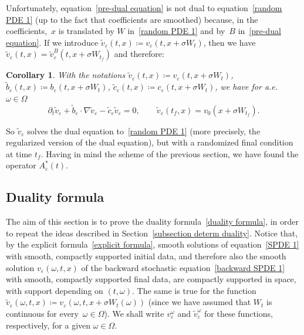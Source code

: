 \documentclass[a4paper,10pt]{article}
\newtheorem{corollary}[theorem]{Corollary}
\newcommand\1{\mathbbm{1}}
\newcommand{\eps}{\varepsilon}
\numberwithin{equation}{section}
\begin{document}
Unfortunately, equation~\eqref{pre-dual equation} is not dual to equation~\eqref{random PDE 1} (up to the fact that coefficients are smoothed) because, in the coefficients,~$x$ is translated by $W$ in~\eqref{random PDE 1} and by~$B$ in~\eqref{pre-dual equation}. If we introduce $\widetilde{v}_{\eps}(t,x) \coloneqq v_{\eps}(t,x+\sigma W_{t}) $, then we have
$\widetilde{v}_{\eps}(t,x)  =\widetilde{v}_{\eps}^{B}(t,x+\sigma W_{t_{f}})$ and therefore:

\begin{corollary}\label{SPDE PDE backward}
With the notations $\widetilde{v}_{\eps}( t,x)\coloneqq v_{\eps}(t,x+\sigma W_{t})$, $\widetilde{b}_{\eps}(t,x)\coloneqq b_{\eps}(t,x+\sigma W_{t})$, $\widetilde{c}_{\eps}(t,x)\coloneqq c_{\eps}(t,x+\sigma W_{t})$, we have for a.e.~$\omega\in\Omega$
\begin{equation}
\partial_t \widetilde{v}_{\eps} +\widetilde{b}_{\eps}\cdot\nabla\widetilde{v}_{\eps}-\widetilde{c}_{\eps}\widetilde{v}_{\eps}=0,\qquad\widetilde{v}_{\eps} (t_{f},x)
=v_{0}(x+\sigma W_{t_{f}}) . \label{dual equation}
\end{equation}
\end{corollary}

So $\widetilde{v}_{\eps}$ solves the dual equation to~\eqref{random PDE 1} (more precisely, the regularized version of the dual equation), but with a randomized final condition at time $t_{f}$. Having in mind the scheme of the previous section, we have found the operator $A^*_\eps(t)$.

\subsection{Duality formula}

The aim of this section is to prove the duality formula~\eqref{duality formula}, in order to repeat the ideas described in Section~\ref{subsection determ duality}. Notice that, by the explicit formula~\eqref{explicit formula}, smooth solutions of equation~\eqref{SPDE 1} with smooth, compactly supported initial data, and therefore also the smooth solution $v_{\eps}(\omega,t,x)$ of the backward stochastic equation~\eqref{backward SPDE 1} with smooth, compactly supported final data, are compactly supported in space, with support depending on $(t,\omega)$. The same is true for the function $\widetilde{v}_{\eps}(\omega,t,x)  \coloneqq v_{\eps}(\omega,t,x+\sigma W_{t}(\omega))$ (since we have assumed that $W_{t}$ is continuous for every~$\omega \in \Omega$). We shall write $v_{\eps}^\omega$ and $\widetilde{v}_{\eps}^\omega$ for these functions, respectively, for a given $\omega\in\Omega$.
\end{document}
